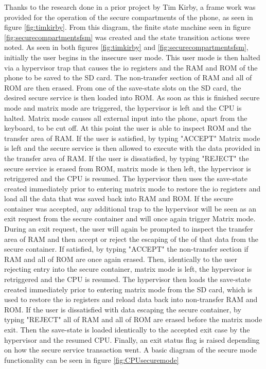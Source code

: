 Thanks to the research done in a prior project by Tim Kirby, a frame work was provided for the operation of the secure compartments of the phone, as seen in figure \ref{fig:timkirby}. From this diagram, the finite state machine seen in figure \ref{fig:securecompartmentsfsm} was created and the state transition actions were noted. As seen in both figures \ref{fig:timkirby} and \ref{fig:securecompartmentsfsm}, initially the user begins in the insecure user mode. This user mode is then halted via a hypervisor trap that causes the io registers and the RAM and ROM of the phone to be saved to the SD card. The non-transfer section of RAM and all of ROM are then erased. From one of the save-state slots on the SD card, the desired secure service is then loaded into ROM. As soon as this is finished secure mode and matrix mode are triggered, the hypervisor is left and the CPU is halted. Matrix mode causes all external input into the phone, apart from the keyboard, to be cut off. At this point the user is able to inspect ROM and the transfer area of RAM. If the user is satisfied, by typing "ACCEPT" Matrix mode is left and the secure service is then allowed to execute with the data provided in the transfer area of RAM. If the user is dissatisfied, by typing "REJECT" the secure service is erased from ROM, matrix mode is then left, the hypervisor is retriggered and the CPU is resumed. The hypervisor then uses the save-state created immediately prior to entering matrix mode to restore the io registers and load all the data that was saved back into RAM and ROM. If the secure container was accepted, any additional trap to the hypervisor will be seen as an exit request from the secure container and will once again trigger Matrix mode. During an exit request, the user will again be prompted to inspect the transfer area of RAM and then accept or reject the escaping of the of that data from the secure container. If satisfied, by typing "ACCEPT" the non-transfer section if RAM and all of ROM are once again erased. Then, identically to the user rejecting entry into the secure container, matrix mode is left, the hypervisor is retriggered and the CPU is resumed. The hypervisor then loads the save-state created immediately prior to entering matrix mode from the SD card, which is used to restore the io registers and reload data back into non-transfer RAM and ROM. If the user is dissatisfied with data escaping the secure container, by typing "REJECT" all of RAM and all of ROM are erased before the matrix mode exit. Then the save-state is loaded identically to the accepted exit case by the hypervisor and the resumed CPU. Finally, an exit status flag is raised depending on how the secure service transaction went. A basic diagram of the secure mode functionality can be seen in figure \ref{fig:CPUsecuremode}

